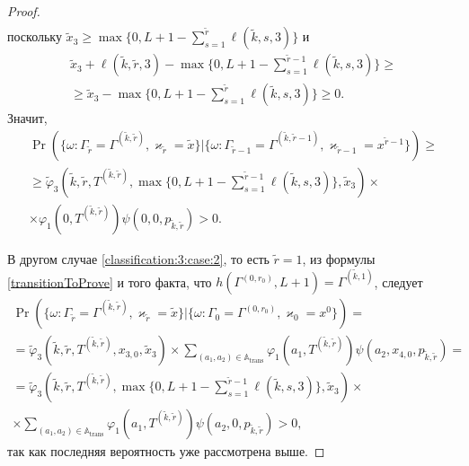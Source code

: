 \begin{proof}
\begin{multline*}
\end{multline*}
поскольку $\tilde{x}_3\geqslant\max{\{0,  L+1-\sum_{s=1}^{\tilde{r}} \ell(\tilde{k},  s,  3)\}}$ и 
\begin{multline*}
    \tilde{x}_3 + \ell (\tilde{k},  \tilde{r},  3) - \max{\{0,  L+1-\sum_{s=1}^{\tilde{r}-1} \ell(\tilde{k},  s,  3)\}} \geqslant \\
    \geqslant \tilde{x}_3 - \max{\{0,  L+1-\sum_{s=1}^{\tilde{r}} \ell(\tilde{k},  s,  3)\}} \geqslant 0.
\end{multline*}
Значит, 
\begin{multline*}
\Pr(\{\omega\colon \Gamma_{\tilde{r}}=\Gamma^{(\tilde{k},  \tilde{r})},  \varkappa_{\tilde{r}}=\tilde{x}\}|\{\omega\colon 
\Gamma_{\tilde{r}-1}=\Gamma^{(\tilde{k},  \tilde{r}-1)},  \varkappa_{\tilde{r}-1}=x^{\tilde{r}-1}\})\geqslant \\
\geqslant \widetilde{\varphi}_3(\tilde{k},  \tilde{r},  T^{(\tilde{k},  \tilde{r})},  \max{\{0,  L+1-\sum_{s=1}^{\tilde{r}-1} \ell(\tilde{k},  s,  3)\}} ,  \tilde{x}_3)
\times \\ \times
\varphi_1(0,  T^{(\tilde{k},  \tilde{r})})  \psi(0,  0,  p_{\tilde{k},  \tilde{r}}) > 0.
\end{multline*}

В другом случае \eqref{classification:3:case:2},  то есть $\tilde{r} = 1$,   из формулы \eqref{transitionToProve} и того факта,  что  $h(\Gamma^{(0,  r_0)},  L+1) = \Gamma^{(\tilde{k},  1)}$,  следует
\begin{multline*}
\Pr(\{\omega\colon \Gamma_{\tilde{r}}=\Gamma^{(\tilde{k},  \tilde{r})},  \varkappa_{\tilde{r}}=\tilde{x}\}|
\{\omega\colon \Gamma_{0}=\Gamma^{(0,  r_0)},  \varkappa_{0}=x^{0}\})=\\
=\widetilde{\varphi}_3(\tilde{k},  \tilde{r},  T^{(\tilde{k},  \tilde{r})},  x_{3, 0},  \tilde{x}_3) 
\times
\sum_{(a_1,  a_2)\in {\mathbb A}_{\mathrm{trans}}}\varphi_1(a_1,  T^{(\tilde{k},  \tilde{r})})  \psi(a_2,  x_{4, 0},  p_{\tilde{k},  \tilde{r}})=\\
=
\widetilde{\varphi}_3(\tilde{k},  \tilde{r},  T^{(\tilde{k},  \tilde{r})},  \max{\{0,  L+1-\sum_{s=1}^{\tilde{r}-1} \ell(\tilde{k},  s,  3)\}} ,  \tilde{x}_3) 
\times \\ \times
\sum_{(a_1,  a_2)\in {\mathbb A}_{\mathrm{trans}}}\varphi_1(a_1,  T^{(\tilde{k},  \tilde{r})})  \psi(a_2,  0,  p_{\tilde{k},  \tilde{r}}) > 0, 
\end{multline*}
так как последняя вероятность уже рассмотрена выше.


\end{proof}
